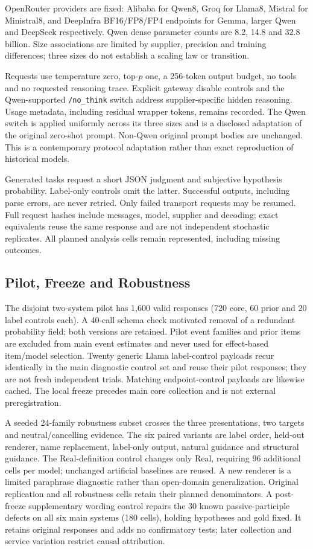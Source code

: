 \documentclass[sigconf,anonymous,review]{acmart}
\begin{document}
OpenRouter providers are fixed: Alibaba for Qwen8, Groq for Llama8, Mistral for Ministral8, and DeepInfra BF16/FP8/FP4 endpoints for Gemma, larger Qwen and DeepSeek respectively. Qwen dense parameter counts are 8.2, 14.8 and 32.8 billion. Size associations are limited by supplier, precision and training differences; three sizes do not establish a scaling law or transition.

Requests use temperature zero, top-$p$ one, a 256-token output budget, no tools and no requested reasoning trace. Explicit gateway disable controls and the Qwen-supported \texttt{/no\_think} switch address supplier-specific hidden reasoning. Usage metadata, including residual wrapper tokens, remains recorded. The Qwen switch is applied uniformly across its three sizes and is a disclosed adaptation of the original zero-shot prompt. Non-Qwen original prompt bodies are unchanged. This is a contemporary protocol adaptation rather than exact reproduction of historical models.

Generated tasks request a short JSON judgment and subjective hypothesis probability. Label-only controls omit the latter. Successful outputs, including parse errors, are never retried. Only failed transport requests may be resumed. Full request hashes include messages, model, supplier and decoding; exact equivalents reuse the same response and are not independent stochastic replicates. All planned analysis cells remain represented, including missing outcomes.

\subsection{Pilot, Freeze and Robustness}
The disjoint two-system pilot has 1,600 valid responses (720 core, 60 prior and 20 label controls each). A 40-call schema check motivated removal of a redundant probability field; both versions are retained. Pilot event families and prior items are excluded from main event estimates and never used for effect-based item/model selection. Twenty generic Llama label-control payloads recur identically in the main diagnostic control set and reuse their pilot responses; they are not fresh independent trials. Matching endpoint-control payloads are likewise cached. The local freeze precedes main core collection and is not external preregistration.

A seeded 24-family robustness subset crosses the three presentations, two targets and neutral/cancelling evidence. The six paired variants are label order, held-out renderer, name replacement, label-only output, natural guidance and structural guidance. The Real-definition control changes only Real, requiring 96 additional cells per model; unchanged artificial baselines are reused. A new renderer is a limited paraphrase diagnostic rather than open-domain generalization. Original replication and all robustness cells retain their planned denominators. A post-freeze supplementary wording control repairs the 30 known passive-participle defects on all six main systems (180 cells), holding hypotheses and gold fixed. It retains original responses and adds no confirmatory tests; later collection and service variation restrict causal attribution.
\end{document}
